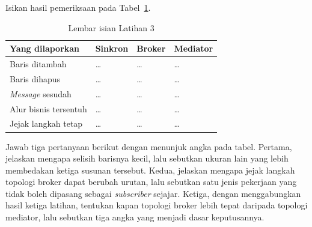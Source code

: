 Isikan hasil pemeriksaan pada Tabel~\ref{tab:lat3event-hasil}.

\begin{table}[htbp]
  \centering
  \caption{Lembar isian Latihan 3}
  \label{tab:lat3event-hasil}
  \begin{tabularx}{\textwidth}{|X|l|l|l|}
    \hline
    \textbf{Yang dilaporkan} & \textbf{Sinkron} & \textbf{Broker} & \textbf{Mediator} \\
    \hline
    Baris ditambah & \dots & \dots & \dots \\
    \hline
    Baris dihapus & \dots & \dots & \dots \\
    \hline
    \textit{Message} sesudah & \dots & \dots & \dots \\
    \hline
    Alur bisnis tersentuh & \dots & \dots & \dots \\
    \hline
    Jejak langkah tetap & \dots & \dots & \dots \\
    \hline
  \end{tabularx}
\end{table}

Jawab tiga pertanyaan berikut dengan menunjuk angka pada tabel. Pertama,
jelaskan mengapa selisih barisnya kecil, lalu sebutkan ukuran lain yang lebih
membedakan ketiga susunan tersebut. Kedua, jelaskan mengapa jejak langkah
topologi broker dapat berubah urutan, lalu sebutkan satu jenis pekerjaan yang
tidak boleh dipasang sebagai \textit{subscriber} sejajar. Ketiga, dengan menggabungkan
hasil ketiga latihan, tentukan kapan topologi broker lebih tepat daripada
topologi mediator, lalu sebutkan tiga angka yang menjadi dasar keputusannya.
